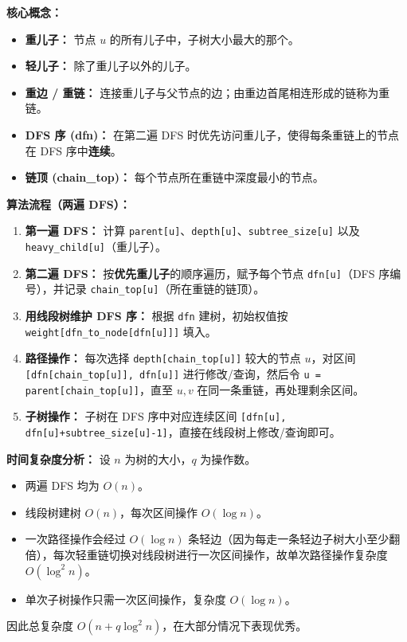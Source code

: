 \textbf{核心概念：}
\begin{itemize}
  \item \textbf{重儿子：} 节点 $u$ 的所有儿子中，子树大小最大的那个。
  \item \textbf{轻儿子：} 除了重儿子以外的儿子。
  \item \textbf{重边 / 重链：} 连接重儿子与父节点的边；由重边首尾相连形成的链称为重链。
  \item \textbf{DFS 序 (dfn)：} 在第二遍 DFS 时优先访问重儿子，使得每条重链上的节点在 DFS 序中\textbf{连续}。
  \item \textbf{链顶 (chain\_top)：} 每个节点所在重链中深度最小的节点。
\end{itemize}

\textbf{算法流程（两遍 DFS）：}
\begin{enumerate}
  \item \textbf{第一遍 DFS：} 计算 \texttt{parent[u]}、\texttt{depth[u]}、\texttt{subtree\_size[u]} 以及 \texttt{heavy\_child[u]}（重儿子）。
  \item \textbf{第二遍 DFS：} 按\textbf{优先重儿子}的顺序遍历，赋予每个节点 \texttt{dfn[u]}（DFS 序编号），并记录 \texttt{chain\_top[u]}（所在重链的链顶）。
  \item \textbf{用线段树维护 DFS 序：} 根据 \texttt{dfn} 建树，初始权值按 \texttt{weight[dfn\_to\_node[dfn[u]]]} 填入。
  \item \textbf{路径操作：} 每次选择 \texttt{depth[chain\_top[u]]} 较大的节点 $u$，对区间 \texttt{[dfn[chain\_top[u]], dfn[u]]} 进行修改/查询，然后令 \texttt{u = parent[chain\_top[u]]}，直至 $u,v$ 在同一条重链，再处理剩余区间。
  \item \textbf{子树操作：} 子树在 DFS 序中对应连续区间 \texttt{[dfn[u], dfn[u]+subtree\_size[u]-1]}，直接在线段树上修改/查询即可。
\end{enumerate}

\textbf{时间复杂度分析：}
设 $n$ 为树的大小，$q$ 为操作数。
\begin{itemize}
  \item 两遍 DFS 均为 $O(n)$。
  \item 线段树建树 $O(n)$，每次区间操作 $O(\log n)$。
  \item 一次路径操作会经过 $O(\log n)$ 条轻边（因为每走一条轻边子树大小至少翻倍），每次轻重链切换对线段树进行一次区间操作，故单次路径操作复杂度 $O(\log^2 n)$。
  \item 单次子树操作只需一次区间操作，复杂度 $O(\log n)$。
\end{itemize}
因此总复杂度 $O(n + q\log^2 n)$，在大部分情况下表现优秀。


